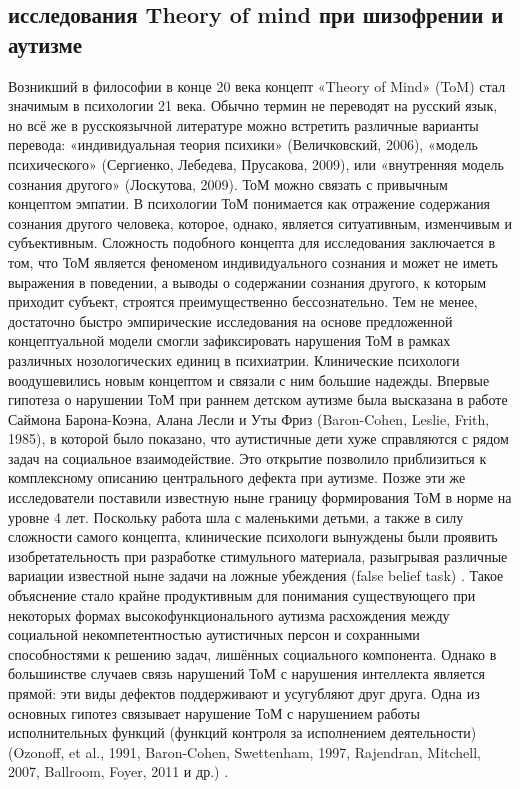 \subsection{исследования Theory of mind при шизофрении и аутизме}
    Возникший в философии в конце 20 века концепт «Theory of Mind» (ToM) стал значимым в психологии 21 века. Обычно термин не переводят на русский язык, но всё же в русскоязычной литературе можно встретить различные варианты перевода: «индивидуальная теория психики» (Величковский, 2006), «модель психического» (Сергиенко, Лебедева, Прусакова, 2009), или «внутренняя модель сознания другого» (Лоскутова, 2009).
ТоМ можно связать с привычным концептом эмпатии. В психологии ТоМ понимается как отражение содержания сознания другого человека, которое, однако, является ситуативным, изменчивым и субъективным. Сложность подобного концепта для исследования заключается в том, что ТоМ является феноменом индивидуального сознания и может не иметь выражения в поведении, а выводы о содержании сознания другого, к которым приходит субъект, строятся преимущественно бессознательно. Тем не менее, достаточно быстро эмпирические исследования на основе предложенной концептуальной модели смогли зафиксировать нарушения ТоМ в рамках различных нозологических единиц в психиатрии. Клинические психологи воодушевились новым концептом и связали с ним большие надежды.
Впервые гипотеза о нарушении ТоМ при раннем детском аутизме была высказана в работе Саймона Барона-Коэна, Алана Лесли и Уты Фриз (Baron-Cohen, Leslie, Frith, 1985), в которой было показано, что аутистичные дети хуже справляются с рядом задач на социальное взаимодействие. Это открытие позволило приблизиться к комплексному описанию центрального дефекта при аутизме. Позже эти же исследователи поставили известную ныне границу формирования ТоМ в норме на уровне 4 лет. Поскольку работа шла с маленькими детьми, а также в силу сложности самого концепта, клинические психологи вынуждены были проявить изобретательность при разработке стимульного материала, разыгрывая различные вариации известной ныне задачи на ложные убеждения (false belief task) . Такое объяснение стало крайне продуктивным для понимания существующего при некоторых формах высокофункционального аутизма расхождения между социальной некомпетентностью аутистичных персон и сохранными способностями к решению задач, лишённых социального компонента. Однако в  большинстве случаев связь нарушений ТоМ с нарушения интеллекта является прямой: эти виды дефектов поддерживают и усугубляют друг друга. Одна из основных гипотез связывает нарушение ТоМ с нарушением работы исполнительных функций (функций контроля за исполнением деятельности) (Ozonoff, et al., 1991, Baron-Cohen, Swettenham, 1997, Rajendran, Mitchell, 2007, Ballroom, Foyer, 2011 и др.) .
